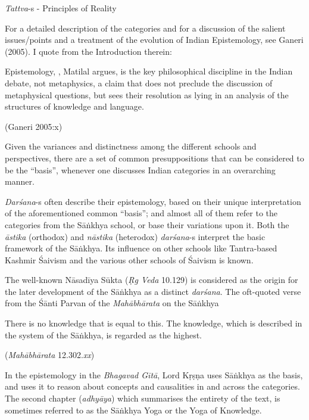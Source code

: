 {\sl Tattva}-s - Principles of Reality

For a detailed description of the categories and for a discussion of the salient issues/points and a treatment of the evolution of Indian Epistemology, see Ganeri (2005). I quote from the Introduction therein:
\begin{myquote}
Epistemology, , Matilal argues, is the key philosophical discipline in the Indian debate, not metaphysics, a claim that does not preclude the discussion of metaphysical questions, but sees their resolution as lying in an analysis of the structures of knowledge and language.

\hfill (Ganeri 2005:x)
\end{myquote}

Given the variances and distinctness among the different schools and perspectives, there are a set of common presuppositions that can be considered to be the ``basis'', whenever one discusses Indian categories in an overarching manner.

{\sl Darśana}-s often describe their epistemology, based on their unique interpretation of the aforementioned common ``basis''; and almost all of them refer to the categories from the Sāṅkhya school, or base their variations upon it. Both the {\sl āstika} (orthodox) and {\sl nāstika} (heterodox) {\sl darśana}-s interpret the basic framework of the Sāṅkhya. Its influence on other schools like Tantra-based Kashmir Śaivism and the various other schools of Śaivism is known.

The well-known Nāsadīya Sūkta ({\sl Ṛg Veda} 10.129) is considered as the origin for the later development of the Sāṅkhya as a distinct {\sl darśana}. The oft-quoted verse from the Śānti Parvan of the {\sl Mahābhārata} on the Sāṅkhya
\begin{myquote}
There is no knowledge that is equal to this. The knowledge, which is described in the system of the Sāṅkhya, is regarded as the highest.

\hfill ({\sl Mahābhārata} 12.302.{\sl xx})
\end{myquote}

In the epistemology in the {\sl Bhagavad Gītā}, Lord Kṛṣṇa uses Sāṅkhya as the basis, and uses it to reason about concepts and causalities in and across the categories. The second chapter ({\sl adhyāya}) which summarises the entirety of the text, is sometimes referred to as the Sāṅkhya Yoga or the Yoga of Knowledge. 

